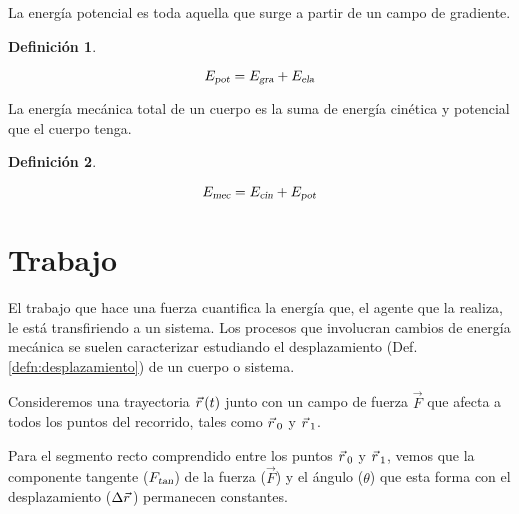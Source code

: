 \documentclass[a5paper,12pt,twoside]{book}
\newtheorem{defn}{{Definición}}[chapter]
\begin{document}
La energía potencial es toda aquella que surge a partir de un campo de gradiente.

\begin{mdframed}[style=MyFrame1]
    \begin{defn}
    \end{defn}
    \begin{equation*}
        {{E}_\textsl{{pot}}} = {{E}_\textsl{{gra}}} + {{E}_\textsl{{ela}}}
    \end{equation*}
\end{mdframed}

La energía mecánica total de un cuerpo es la suma de energía cinética y potencial que el cuerpo tenga.

\begin{mdframed}[style=MyFrame1]
    \begin{defn}
        \label{defn:mechanicEnergy}
    \end{defn}
    \begin{equation*}
        {{E}_\textsl{{mec}}} = {{E}_\textsl{{cin}}} + {{E}_\textsl{{pot}}}
    \end{equation*}
\end{mdframed}


\section{Trabajo}

El trabajo que hace una fuerza cuantifica la energía que, el agente que la realiza, le está transfiriendo a un sistema. Los procesos que involucran cambios de energía mecánica se suelen caracterizar estudiando el desplazamiento (Def. \ref{defn:desplazamiento}) de un cuerpo o sistema.

Consideremos una trayectoria $\vec{r}\hspace{0.05cm}(t)$ junto con un campo de fuerza $\vec{F}$ que afecta a todos los puntos del recorrido, tales como $\vec{r}\hspace{0.05cm}_0$ y $\vec{r}\hspace{0.05cm}_1$.

\begin{center}
    \def\svgwidth{0.8\linewidth}
    
\end{center}

Para el segmento recto comprendido entre los puntos $\vec{r}\hspace{0.05cm}_0$ y $\vec{r}\hspace{0.05cm}_1$, vemos que la componente tangente (${{F}_\textsl{{tan}}}$) de la fuerza ($\vec{F}$) y el ángulo ($\theta$) que esta forma con el desplazamiento ($\Delta \vec{r}\hspace{0.05cm}$) permanecen constantes.

\begin{center}
    \def\svgwidth{0.6\linewidth}
    
\end{center}
\end{document}
